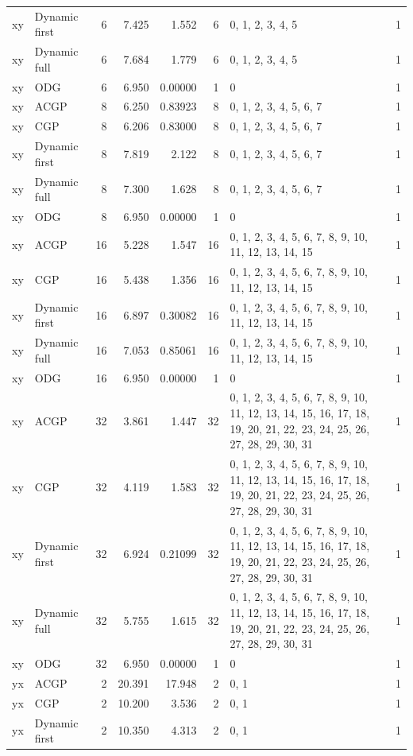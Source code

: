 \documentclass[10pt,a4paper]{article}
\begin{document}
\begin{longtable}{@{}p{23mm}p{29mm}rrrrp{36mm}r@{}}
xy & Dynamic first & 6 & 7.425 & 1.552 & 6 & 0, 1, 2, 3, 4, 5 & 1 \\
xy & Dynamic full & 6 & 7.684 & 1.779 & 6 & 0, 1, 2, 3, 4, 5 & 1 \\
xy & ODG & 6 & 6.950 & 0.00000 & 1 & 0 & 1 \\
xy & ACGP & 8 & 6.250 & 0.83923 & 8 & 0, 1, 2, 3, 4, 5, 6, 7 & 1 \\
xy & CGP & 8 & 6.206 & 0.83000 & 8 & 0, 1, 2, 3, 4, 5, 6, 7 & 1 \\
xy & Dynamic first & 8 & 7.819 & 2.122 & 8 & 0, 1, 2, 3, 4, 5, 6, 7 & 1 \\
xy & Dynamic full & 8 & 7.300 & 1.628 & 8 & 0, 1, 2, 3, 4, 5, 6, 7 & 1 \\
xy & ODG & 8 & 6.950 & 0.00000 & 1 & 0 & 1 \\
xy & ACGP & 16 & 5.228 & 1.547 & 16 & 0, 1, 2, 3, 4, 5, 6, 7, 8, 9, 10, 11, 12, 13, 14, 15 & 1 \\
xy & CGP & 16 & 5.438 & 1.356 & 16 & 0, 1, 2, 3, 4, 5, 6, 7, 8, 9, 10, 11, 12, 13, 14, 15 & 1 \\
xy & Dynamic first & 16 & 6.897 & 0.30082 & 16 & 0, 1, 2, 3, 4, 5, 6, 7, 8, 9, 10, 11, 12, 13, 14, 15 & 1 \\
xy & Dynamic full & 16 & 7.053 & 0.85061 & 16 & 0, 1, 2, 3, 4, 5, 6, 7, 8, 9, 10, 11, 12, 13, 14, 15 & 1 \\
xy & ODG & 16 & 6.950 & 0.00000 & 1 & 0 & 1 \\
xy & ACGP & 32 & 3.861 & 1.447 & 32 & 0, 1, 2, 3, 4, 5, 6, 7, 8, 9, 10, 11, 12, 13, 14, 15, 16, 17, 18, 19, 20, 21, 22, 23, 24, 25, 26, 27, 28, 29, 30, 31 & 1 \\
xy & CGP & 32 & 4.119 & 1.583 & 32 & 0, 1, 2, 3, 4, 5, 6, 7, 8, 9, 10, 11, 12, 13, 14, 15, 16, 17, 18, 19, 20, 21, 22, 23, 24, 25, 26, 27, 28, 29, 30, 31 & 1 \\
xy & Dynamic first & 32 & 6.924 & 0.21099 & 32 & 0, 1, 2, 3, 4, 5, 6, 7, 8, 9, 10, 11, 12, 13, 14, 15, 16, 17, 18, 19, 20, 21, 22, 23, 24, 25, 26, 27, 28, 29, 30, 31 & 1 \\
xy & Dynamic full & 32 & 5.755 & 1.615 & 32 & 0, 1, 2, 3, 4, 5, 6, 7, 8, 9, 10, 11, 12, 13, 14, 15, 16, 17, 18, 19, 20, 21, 22, 23, 24, 25, 26, 27, 28, 29, 30, 31 & 1 \\
xy & ODG & 32 & 6.950 & 0.00000 & 1 & 0 & 1 \\
yx & ACGP & 2 & 20.391 & 17.948 & 2 & 0, 1 & 1 \\
yx & CGP & 2 & 10.200 & 3.536 & 2 & 0, 1 & 1 \\
yx & Dynamic first & 2 & 10.350 & 4.313 & 2 & 0, 1 & 1 \\

\end{longtable}
\end{document}
